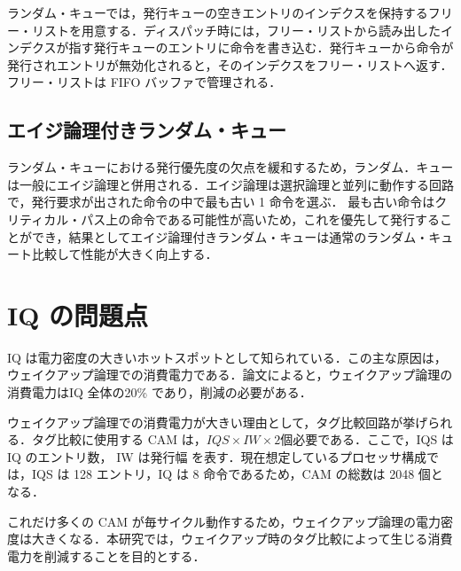 ランダム・キューでは，発行キューの空きエントリのインデクスを保持するフリー・リストを用意する．ディスパッチ時には，フリー・リストから読み出したインデクスが指す発行キューのエントリに命令を書き込む．発行キューから命令が発行されエントリが無効化されると，そのインデクスをフリー・リストへ返す．フリー・リストは FIFO バッファで管理される．

\subsection{エイジ論理付きランダム・キュー}
ランダム・キューにおける発行優先度の欠点を緩和するため，ランダム．キューは一般にエイジ論理と併用される．エイジ論理は選択論理と並列に動作する回路で，発行要求が出された命令の中で最も古い 1 命令を選ぶ．
最も古い命令はクリティカル・パス上の命令である可能性が高いため，これを優先して発行することができ，結果としてエイジ論理付きランダム・キューは通常のランダム・キュート比較して性能が大きく向上する．

\section{IQ の問題点}
\label{sec:iq_problem}
IQ は電力密度の大きいホットスポットとして知られている．この主な原因は，ウェイクアップ論理での消費電力である．論文によると，ウェイクアップ論理の消費電力はIQ 全体の20\% であり，削減の必要がある．

ウェイクアップ論理での消費電力が大きい理由として，タグ比較回路が挙げられる．タグ比較に使用する CAM は，$IQS \times IW \times 2$個必要である．ここで，IQS は IQ のエントリ数， IW は発行幅 を表す．現在想定しているプロセッサ構成では，IQS は 128 エントリ，IQ は 8 命令であるため，CAM の総数は 2048 個となる．

これだけ多くの CAM が毎サイクル動作するため，ウェイクアップ論理の電力密度は大きくなる．本研究では，ウェイクアップ時のタグ比較によって生じる消費電力を削減することを目的とする．

















